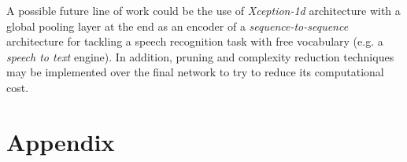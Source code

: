 \documentclass[review]{elsarticle}
\begin{document}
A possible future line of work could be  the use of \textit{Xception-1d} architecture with a global pooling layer at the end  as an encoder of a \textit{sequence-to-sequence} architecture for tackling a speech recognition task with free vocabulary (e.g. a \textit{speech to text} engine). In addition, pruning and complexity reduction techniques may be implemented over the final network to try to reduce its computational cost.




\newpage




\newpage

\section*{Appendix}
\end{document}
